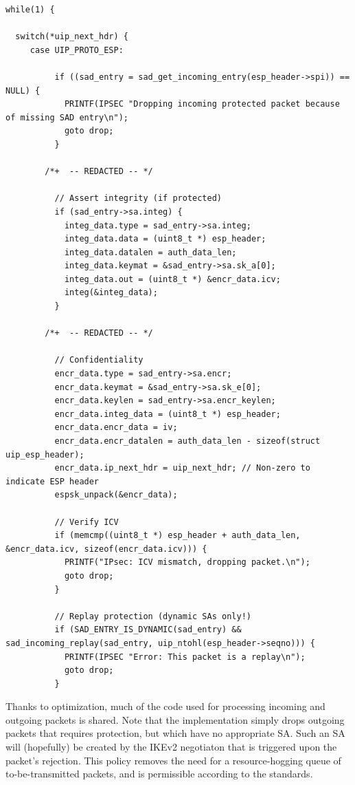 \documentclass[final,a4paper,twoside,11pt,onecolumn]{report}
\begin{document}
\lstset{language=c}
\begin{lstlisting}
while(1) {
 
  switch(*uip_next_hdr) {
     case UIP_PROTO_ESP:

    	  if ((sad_entry = sad_get_incoming_entry(esp_header->spi)) == NULL) {
    	    PRINTF(IPSEC "Dropping incoming protected packet because of missing SAD entry\n");
    	    goto drop;
    	  }

        /*+  -- REDACTED -- */

    	  // Assert integrity (if protected)
    	  if (sad_entry->sa.integ) {
    	    integ_data.type = sad_entry->sa.integ;
    	    integ_data.data = (uint8_t *) esp_header;
    	    integ_data.datalen = auth_data_len;
    	    integ_data.keymat = &sad_entry->sa.sk_a[0];
    	    integ_data.out = (uint8_t *) &encr_data.icv;          
    	    integ(&integ_data);
    	  }
    	
        /*+  -- REDACTED -- */

    	  // Confidentiality      	  
    	  encr_data.type = sad_entry->sa.encr;
    	  encr_data.keymat = &sad_entry->sa.sk_e[0];
    	  encr_data.keylen = sad_entry->sa.encr_keylen;
    	  encr_data.integ_data = (uint8_t *) esp_header;
    	  encr_data.encr_data = iv;
    	  encr_data.encr_datalen = auth_data_len - sizeof(struct uip_esp_header);
    	  encr_data.ip_next_hdr = uip_next_hdr; // Non-zero to indicate ESP header
    	  espsk_unpack(&encr_data);
    	  
    	  // Verify ICV
    	  if (memcmp((uint8_t *) esp_header + auth_data_len, &encr_data.icv, sizeof(encr_data.icv))) {
    	    PRINTF("IPsec: ICV mismatch, dropping packet.\n");
    	    goto drop;
    	  }
    	
    	  // Replay protection (dynamic SAs only!)
    	  if (SAD_ENTRY_IS_DYNAMIC(sad_entry) && sad_incoming_replay(sad_entry, uip_ntohl(esp_header->seqno))) {          
    	    PRINTF(IPSEC "Error: This packet is a replay\n");
    	    goto drop;
    	  }
\end{lstlisting}

Thanks to optimization, much of the code used for processing incoming and outgoing packets is shared. Note that the implementation simply drops outgoing packets that requires protection, but which have no appropriate SA. Such an SA will (hopefully) be created by the IKEv2 negotiaton that is triggered upon the packet's rejection. This policy removes the need for a resource-hogging queue of to-be-transmitted packets, and is permissible according to the standards\citep[p.53]{rfc4301}.
\end{document}
